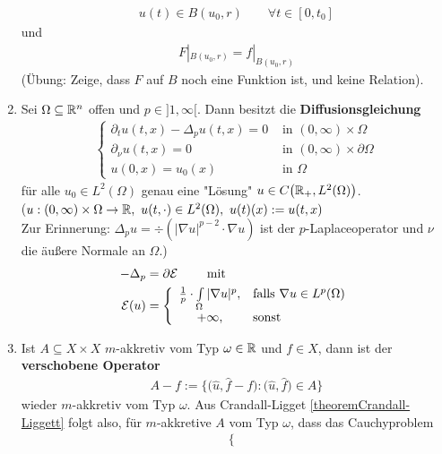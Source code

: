 \begin{korollar}
\begin{enumerate}[label=(\alph*)]
		\begin{align*}
			u(t)\in B(u_0,r)\qquad\forall t\in[0,t_0]
		\end{align*}
		und 
		\begin{align*}
			F|_{B(u_0,r)}=f|_{B(u_0,r)}
		\end{align*}
		(Übung: Zeige, dass $F$ auf $B$ noch eine Funktion ist, und keine Relation).
		\item Sei $\Omega\subseteq\mathbb{R}^n$ offen und $p\in]1,\infty[$. Dann besitzt die \textbf{Diffusionsgleichung}
		\begin{align}\label{eqDiffusionsgleichung}\tag{Diffu}
			\left\lbrace\begin{array}{rl}
				\partial_t u(t,x)-\Delta_p u(t,x)=0 &\text{ in }(0,\infty)\times\Omega\\
				\partial_\nu u(t,x)=0 &\text{ in }(0,\infty)\times\partial\Omega\\
				u(0,x)=u_0(x) &\text{ in }\Omega
			\end{array}\right.
		\end{align}
		für alle $u_0\in L^2(\Omega)$ genau eine  "Lösung" $u\in C\big(\mathbb{R}_+, L^2(\Omega)\big)$.\\
		($u:(0,\infty)\times\Omega\to\mathbb{R},~u(t,\cdot)\in L^2(\Omega),~u(t)(x):=u(t,x)$\\
		Zur Erinnerung: 
		$\Delta_p u=\div\left(|\nabla u|^{p-2}\cdot\nabla u\right)$ ist der $p$-Laplaceoperator und $\nu$ die äußere Normale an $\Omega$.)
		\begin{align*}
			-\Delta_p&=\partial\mathcal{E}\qquad\text{ mit }\\
			\mathcal{E}(u)&=\left\lbrace\begin{array}{cl}
				\frac{1}{p}\cdot\int\limits_\Omega |\nabla u|^p, &\text{falls }\nabla u\in L^p(\Omega)\\
				+\infty ,&\text{sonst }
			\end{array}\right.
		\end{align*}
		\item Ist $A\subseteq X\times X$ $m$-akkretiv vom Typ $\omega\in\mathbb{R}$ und $f\in X$, dann ist der \textbf{verschobene Operator}
		\begin{align*}
			A-f:=\Big\lbrace\big(\hat{u},\hat{f}-f\big):\big(\hat{u},\hat{f}\big)\in A\Big\rbrace
		\end{align*}
		wieder $m$-akkretiv vom Typ $\omega$. Aus Crandall-Ligget \ref{theoremCrandall-Liggett} folgt also, für $m$-akkretive $A$ vom Typ $\omega$, dass 			das Cauchyproblem
		\begin{align*}
			\left\lbrace\begin{array}{rl}

\end{array}
\end{align*}
\end{enumerate}
\end{korollar}
